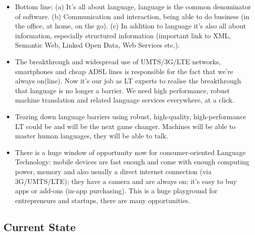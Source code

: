 \begin{multicols}{2}

\begin{itemize}
\item Bottom line: (a) It’s all about language, language is the common denominator of software. (b) Communication and interaction, being able to do business (in the office, at home, on the go). (c) In addition to language it’s also all about information, especially structured information (important link to XML, Semantic Web, Linked Open Data, Web Services etc.).
\item The breakthrough and widespread use of UMTS/3G/LTE networks, smartphones and cheap ADSL lines is responsible for the fact that we’re always on(line). Now it’s our job as LT experts to realise the breakthrough that language is no longer a barrier. We need high performance, robust machine translation and related language services everywhere, at a click.
\item Tearing down language barriers using robust, high-quality, high-performance LT could be and will be the next game changer. Machines will be able to master human languages, they will be able to talk.
\item There is a huge window of opportunity now for consumer-oriented Language Technology: mobile devices are fast enough and come with enough computing power, memory and also usually a direct internet connection (via 3G/UMTS/LTE); they have a camera and are always on; it’s easy to buy apps or add-ons (in-app purchasing). This is a huge playground for entrepreneurs and startups, there are many opportunities.
\end{itemize}

\subsection{Current State}
\label{sec:current-state}


\end{multicols}
